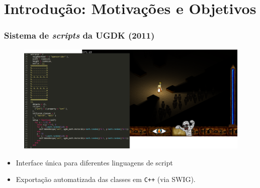 \documentclass[brazil]{beamer}
\begin{document}
\section{Introdução: Motivações e Objetivos}
\begin{frame}[fragile]
  \frametitle{Sistema de \textit{scripts} da UGDK (2011)}
  \pause
  \begin{figure}
    \includegraphics[width=.9\textwidth]{images/horus+sublime.png}
  \end{figure}
  \vspace{-10pt}
  \begin{itemize}
    \pause
    \item Interface única para diferentes linguagens de script
    \pause
    \item Exportação automatizada das classes em \texttt{C++} (via SWIG).
  \end{itemize}
\end{frame}
\end{document}
